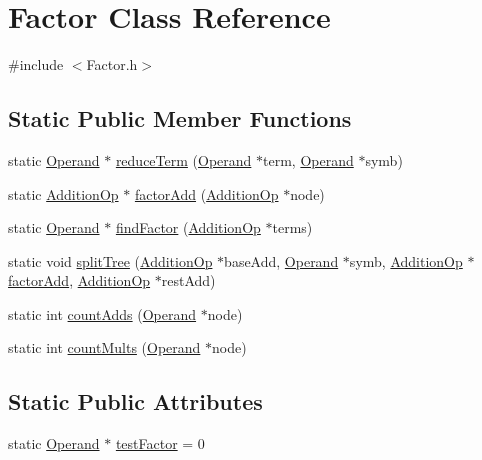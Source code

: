 \hypertarget{class_factor}{\section{Factor Class Reference}
\label{class_factor}
}


{\ttfamily \#include $<$Factor.\+h$>$}

\subsection*{Static Public Member Functions}
\begin{DoxyCompactItemize}
\item 
static \hyperlink{class_operand}{Operand} $\ast$ \hyperlink{class_factor_a32b4d25bf955b224966521ab6410b721}{reduce\+Term} (\hyperlink{class_operand}{Operand} $\ast$term, \hyperlink{class_operand}{Operand} $\ast$symb)
\item 
static \hyperlink{class_addition_op}{Addition\+Op} $\ast$ \hyperlink{class_factor_a0c0e7abb73bc3de0b241e3862c6946f0}{factor\+Add} (\hyperlink{class_addition_op}{Addition\+Op} $\ast$node)
\item 
static \hyperlink{class_operand}{Operand} $\ast$ \hyperlink{class_factor_a11a8f832b5675426eb1c99d0d04edf25}{find\+Factor} (\hyperlink{class_addition_op}{Addition\+Op} $\ast$terms)
\item 
static void \hyperlink{class_factor_a9356f713c8e7682079658836020aa53e}{split\+Tree} (\hyperlink{class_addition_op}{Addition\+Op} $\ast$base\+Add, \hyperlink{class_operand}{Operand} $\ast$symb, \hyperlink{class_addition_op}{Addition\+Op} $\ast$\hyperlink{class_factor_a0c0e7abb73bc3de0b241e3862c6946f0}{factor\+Add}, \hyperlink{class_addition_op}{Addition\+Op} $\ast$rest\+Add)
\item 
static int \hyperlink{class_factor_ac96af46d1a23f2149d57ffc7b6d4527d}{count\+Adds} (\hyperlink{class_operand}{Operand} $\ast$node)
\item 
static int \hyperlink{class_factor_a46b96eb50bd24d7eb6552472c0900066}{count\+Mults} (\hyperlink{class_operand}{Operand} $\ast$node)
\end{DoxyCompactItemize}
\subsection*{Static Public Attributes}
\begin{DoxyCompactItemize}
\item 
static \hyperlink{class_operand}{Operand} $\ast$ \hyperlink{class_factor_ab9b06006dd838e95ac84c49ba6ae93bb}{test\+Factor} = 0
\end{DoxyCompactItemize}


